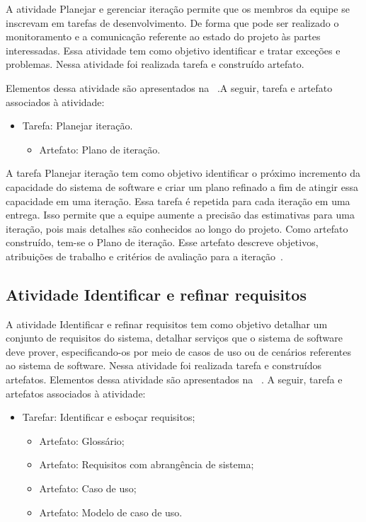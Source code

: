 A atividade Planejar e gerenciar iteração permite que os membros da equipe se inscrevam em tarefas de desenvolvimento. De forma que pode ser realizado o monitoramento e a comunicação referente ao estado do projeto às partes interessadas. Essa atividade tem como objetivo identificar e tratar exceções e problemas. Nessa atividade foi realizada tarefa e construído artefato. 

%

Elementos dessa atividade são apresentados na ~.A seguir, tarefa e artefato associados à atividade:

\begin{itemize}
    \item Tarefa: Planejar iteração.
        \begin{itemize}
            \item Artefato: Plano de iteração.
        \end{itemize}
\end{itemize}

A tarefa Planejar iteração tem como objetivo identificar o próximo incremento da capacidade do sistema de software e criar um plano refinado a fim de atingir essa capacidade em uma iteração. Essa tarefa é repetida para cada iteração em uma entrega. Isso permite que a equipe aumente a precisão das estimativas para uma iteração, pois mais detalhes são conhecidos ao longo do projeto. Como artefato construído, tem-se  o Plano de iteração. Esse artefato descreve objetivos, atribuições de trabalho e critérios de avaliação para a iteração~\cite{openup}.

\subsection{Atividade Identificar e refinar requisitos}

A atividade Identificar e refinar requisitos tem como objetivo detalhar um conjunto de requisitos do sistema, detalhar serviços que o sistema de software deve prover, especificando-os por meio de casos de uso ou de cenários referentes ao sistema de software. Nessa atividade foi realizada tarefa e construídos artefatos. Elementos dessa atividade são apresentados na ~. A seguir, tarefa e artefatos associados à atividade:

\begin{itemize}
    \item Tarefar: Identificar e esboçar requisitos;
        \begin{itemize}
            \item Artefato: Glossário;
            \item Artefato: Requisitos com abrangência de sistema;
            \item Artefato: Caso de uso;
            \item Artefato: Modelo de caso de uso.
        \end{itemize}
\end{itemize}

